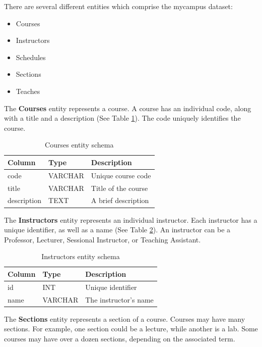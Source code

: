 \documentclass[12pt,letterpaper,oneside]{report}
\theoremstyle{definition}
\begin{document}
			There are several different entities which comprise the mycampus dataset:
			
			\begin{itemize}
				\item Courses
				\item Instructors
				\item Schedules
				\item Sections
				\item Teaches
			\end{itemize}
			
			The \textbf{Courses} entity represents a course.  A course has an individual code, along with a title and a description (See Table  \ref{tbl:courses-entity-schema}).  The code uniquely identifies the course.
			
			\begin{table}[!htp]
				\centering
				\begin{tabular}{lll}
					\toprule
					Column & Type & Description \\
					\midrule
					code & VARCHAR & Unique course code \\
					title & VARCHAR & Title of the course \\
					description & TEXT & A brief description \\
					\bottomrule
				\end{tabular}
				\caption{Courses entity schema}
				\label{tbl:courses-entity-schema}
			\end{table}
			
			The \textbf{Instructors} entity represents an individual instructor.  Each instructor has a unique identifier, as well as a name (See Table \ref{tbl:instructors-entity-schema}).  An instructor can be a Professor, Lecturer, Sessional Instructor, or Teaching Assistant.
			
			\begin{table}[!htp]
				\centering
				\begin{tabular}{lll}
					\toprule
					Column & Type & Description \\
					\midrule
					id & INT & Unique identifier \\
					name & VARCHAR & The instructor's name \\
					\bottomrule
				\end{tabular}
				\caption{Instructors entity schema}
				\label{tbl:instructors-entity-schema}
			\end{table}
			
			The \textbf{Sections} entity represents a section of a course.  Courses may have many sections.  For example, one section could be a lecture, while another is a lab.  Some courses may have over a dozen sections, depending on the associated term.
			
\end{document}

